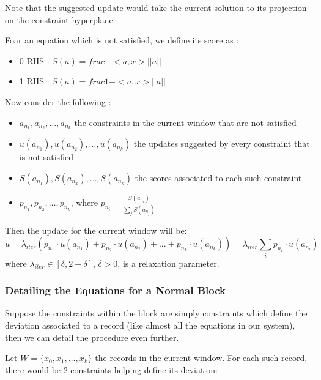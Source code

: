 \documentclass[a4paper,twoside,10pt]{report}
\begin{document}
	Note that the suggested update would take the current solution to its projection on the constraint hyperplane.
	
	Foar an equation which is not satisfied, we define its score as :
	\begin{itemize}
		\item 0 RHS : \(S(a) = frac{-<a, x>}{||a||}\)
		\item 1 RHS : \(S(a) = frac{1 - <a, x>}{||a||}\)
	\end{itemize}
	
	Now consider the following :
	
	\begin{itemize}
		\item \(a_{n_1}, a_{n_2},\ldots, a_{n_k}\) the constraints in the current window that are not satisfied
		\item \(u(a_{n_1}), u(a_{n_2}),\ldots, u(a_{n_k})\) the updates suggested by every constraint that is not satisfied
		\item \(S(a_{n_1}), S(a_{n_2}),\ldots, S(a_{n_k})\) the scores associated to each such constraint
		\item \(p_{n_1}, p_{n_2},\ldots,p_{n_k}\), where \(p_{n_i} = \frac{S(a_{n_i})}{\sum_j {S(a_{n_j})}}\)
	\end{itemize}

	Then the update for the current window will be:	
	\[
		u = \lambda_{iter} (p_{n_1} \cdot u(a_{n_1}) + p_{n_2} \cdot u(a_{n_2}) + ... + p_{n_k} \cdot u(a_{n_k})) = \lambda_{iter} \sum_i {p_{n_i} \cdot u(a_{n_i})}
	\]
	where \(\lambda_{iter}\in [\delta, 2-\delta]\), \(\delta > 0\), is a relaxation parameter.
	
	\subsubsection{Detailing the Equations for a Normal Block}
	Suppose the constraints within the block are simply constraints which define the deviation associated to a record (like almost all the equations
in our system), then we can detail the procedure even further. 
	
	Let \(W = \{x_0, x_1, \ldots, x_k\}\) the records in the current window. For each such record, there would be 2 constraints helping define its deviation:
	
\end{document}
